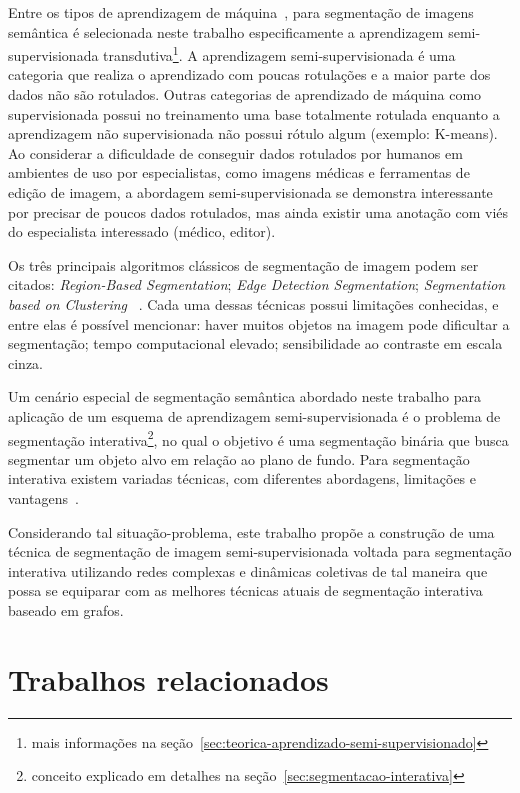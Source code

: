 Entre os tipos de aprendizagem de máquina~\cite{sah2020machine}, para segmentação de imagens
semântica é selecionada neste trabalho especificamente a aprendizagem
semi-supervisionada transdutiva\footnote{mais informações na
seção~\ref{sec:teorica-aprendizado-semi-supervisionado}}. A
aprendizagem semi-supervisionada é uma categoria que realiza o
aprendizado com poucas rotulações e a maior parte dos dados não são
rotulados. Outras categorias de aprendizado de máquina como
supervisionada possui no treinamento uma base totalmente rotulada
enquanto a aprendizagem não supervisionada não possui rótulo algum
(exemplo: K-means). Ao considerar a dificuldade de conseguir dados
rotulados por humanos em ambientes de uso por especialistas, como imagens
médicas e ferramentas de edição de imagem, a abordagem
semi-supervisionada se demonstra interessante por precisar de poucos
dados rotulados, mas ainda existir uma anotação com viés do
especialista interessado (médico, editor).


Os três principais algoritmos clássicos de segmentação de imagem podem
ser citados: \textit{Region-Based Segmentation}; \textit{Edge Detection
  Segmentation}; \textit{Segmentation based on Clustering}
~\cite{ImageSegmentationTechniques1985}. Cada uma dessas técnicas
possui limitações conhecidas, e entre elas é possível mencionar: haver
muitos objetos na imagem pode dificultar a segmentação; tempo
computacional elevado; sensibilidade ao contraste em escala cinza.

Um cenário especial de segmentação semântica abordado neste trabalho
para aplicação de um esquema de aprendizagem semi-supervisionada é o
problema de segmentação interativa\footnote{conceito explicado em
detalhes na seção~\ref{sec:segmentacao-interativa}}, no qual o
objetivo é uma segmentação binária que busca segmentar um objeto alvo
em relação ao plano de fundo. Para segmentação interativa existem
variadas técnicas, com diferentes abordagens, limitações e
vantagens~\cite{ramadan2020survey}.

Considerando tal situação-problema, este trabalho propõe a construção
de uma técnica de segmentação de imagem semi-supervisionada voltada
para segmentação interativa utilizando redes complexas e dinâmicas
coletivas de tal maneira que possa se equiparar com as melhores técnicas
atuais de segmentação interativa baseado em grafos.

\section{Trabalhos relacionados}\label{cap:trabalhos-relacionados}

